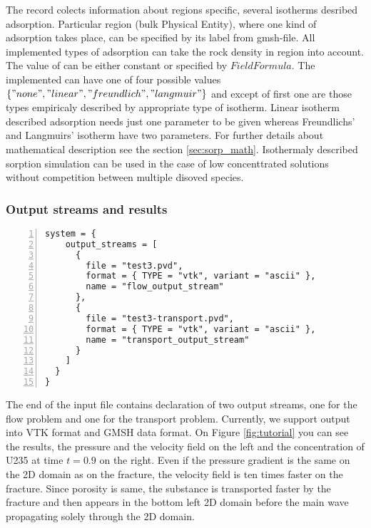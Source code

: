 \documentclass[12pt,a4paper]{report}
\begin{document}
The record  colects information about regions specific, several isotherms desribed adsorption. Particular region (bulk Physical Entity), where one kind of adsorption takes place, can be specified by its label from gmsh-file. All implemented types of adsorption can take the rock density in region into account. The value of  can be either constant or specified by $FieldFormula$. The implemented  can have one of four possible values $\{ "none", "linear", "freundlich", "langmuir"\}$ and except of first one are those types empiricaly described by appropriate type of isotherm. Linear isotherm described adsorption needs just one parameter to be given whereas Freundlichs' and Langmuirs' isotherm have two parameters. For further details about mathematical description see the section \ref{sec:sorp_math}. Isothermaly described sorption simulation can be used in 
the case of low concenttrated solutions without competition between multiple disoved species.

\subsubsection{Output streams and results}
\begin{Verbatim}[numbers=left, firstnumber=last]
  system = {
    output_streams = [
      {
        file = "test3.pvd", 
        format = { TYPE = "vtk", variant = "ascii" },
        name = "flow_output_stream"
      }, 
      {
        file = "test3-transport.pvd", 
        format = { TYPE = "vtk", variant = "ascii" },
        name = "transport_output_stream"
      }
    ]
  }
} 
\end{Verbatim}
The end of the input file contains declaration of two output streams, one for the flow problem and one for the transport problem. Currently, we support output into VTK format and GMSH data format.
On Figure \ref{fig:tutorial} you can see the results, the pressure and the velocity field on the left and the concentration of U235 at time $t=0.9$ on the right. Even if the pressure gradient is
the same on the 2D domain as on the fracture, the velocity field is ten times faster on the fracture. Since porosity is same, the substance is transported faster by the fracture and
then appears in the bottom left 2D domain before the main wave propagating solely through the 2D domain.
\end{document}
